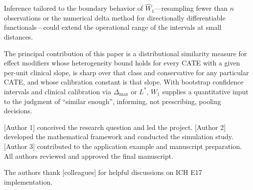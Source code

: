 \documentclass[AMA,Times1COL]{WileyNJDv5}
\begin{document}
Inference tailored to the boundary behavior of $\widehat{W}_1$---resampling fewer than $n$ observations\cite{bickel1997} or the numerical delta method for directionally differentiable functionals\cite{hong2018}---could extend the operational range of the intervals at small distances.

The principal contribution of this paper is a distributional similarity measure for effect modifiers whose heterogeneity bound holds for every CATE with a given per-unit clinical slope, is sharp over that class and conservative for any particular CATE, and whose calibration constant is that slope. With bootstrap confidence intervals and clinical calibration via $\Delta_{\max}$ or $L^*$, $W_1$ supplies a quantitative input to the judgment of ``similar enough'', informing, not prescribing, pooling decisions.



[Author 1] conceived the research question and led the project. [Author 2] developed the mathematical framework and conducted the simulation study. [Author 3] contributed to the application example and manuscript preparation. All authors reviewed and approved the final manuscript.


The authors thank [colleagues] for helpful discussions on ICH E17 implementation.
\end{document}
